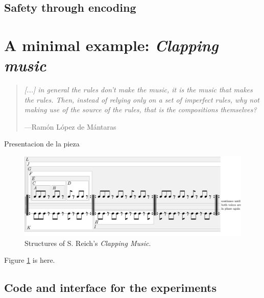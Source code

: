 \documentclass{article}
\begin{document}
\subsection{Safety through encoding}








\section{A minimal example: \textsl{Clapping music}}

\begin{samepage}
\begin{quotation}
\textsl{[...] in general the rules don't make the music, it is the music that makes the rules. Then, instead of relying only on a set of imperfect rules, why not making use of the source of the rules, that is the compositions themselves?
}

---Ram\'{o}n L\'{o}pez de M\'{a}ntaras \cite{LopezdeMantaras:2006:MMA:1565082.1565089}
\end{quotation}
\end{samepage}



{\color{red}

Presentacion de la pieza

}


\begin{figure}
  \includegraphics[width=\linewidth]{figs/clapping_patterns.pdf}
  \caption{Structures of S. Reich's \emph{Clapping Music}.}
  \label{fig:boat1}
\end{figure}

{\color{red}

Figure \ref{fig:boat1} is here.

}

\subsection{Code and interface for the experiments}
\end{document}
